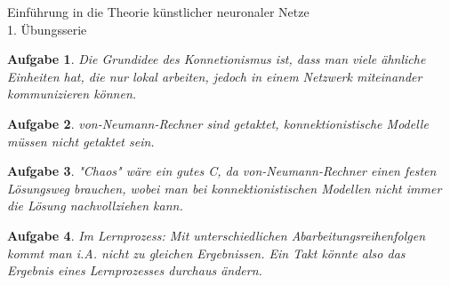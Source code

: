 \documentclass[11pt]{article}
\theoremstyle{break}
\newtheorem{task}{Aufgabe}
\newcommand{\hw}{1}
\begin{document}
\begin{center}
\Large{Einführung in die Theorie künstlicher neuronaler Netze}\\
\large{\hw. Übungsserie}
\end{center}
\begin{task}
    Die Grundidee des Konnetionismus ist, dass man viele ähnliche Einheiten hat, die nur lokal arbeiten, jedoch in einem Netzwerk miteinander kommunizieren können.
\end{task}
\begin{task}
    von-Neumann-Rechner sind getaktet, konnektionistische Modelle müssen nicht getaktet sein.
\end{task}
\begin{task}
    "Chaos" wäre ein gutes C, da von-Neumann-Rechner einen festen Lösungsweg brauchen, wobei man bei konnektionistischen Modellen nicht immer die Lösung nachvollziehen kann.
\end{task}
\begin{task}
    Im Lernprozess: Mit unterschiedlichen Abarbeitungsreihenfolgen kommt man i.A. nicht zu gleichen Ergebnissen. Ein Takt könnte also das Ergebnis eines Lernprozesses durchaus ändern.
\end{task}
\end{document}
